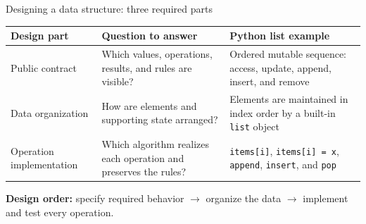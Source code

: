 \documentclass[aspectratio=169]{beamer}
\begin{document}
\begin{frame}{Designing a data structure: three required parts}
  \footnotesize
  \begin{center}
  \end{center}

  \vspace{0.35em}
  \begin{center}
    \setlength{\tabcolsep}{4pt}
    \renewcommand{\arraystretch}{1.02}
    \begin{tabular}{L{0.17\textwidth}L{0.33\textwidth}L{0.39\textwidth}}
      \toprule
      \textbf{Design part} & \textbf{Question to answer} & \textbf{Python list example} \\
      \midrule
      Public contract & Which values, operations, results, and rules are visible? &
        Ordered mutable sequence: access, update, append, insert, and remove \\
      Data organization & How are elements and supporting state arranged? &
        Elements are maintained in index order by a built-in \texttt{list} object \\
      Operation implementation & Which algorithm realizes each operation and preserves the rules? &
        \texttt{items[i]}, \texttt{items[i] = x}, \texttt{append}, \texttt{insert}, and \texttt{pop} \\
      \bottomrule
    \end{tabular}
  \end{center}

  \vspace{0.10em}
  \centering
  \textbf{Design order:} specify required behavior $\rightarrow$ organize the data
  $\rightarrow$ implement and test every operation.
\end{frame}
\end{document}

